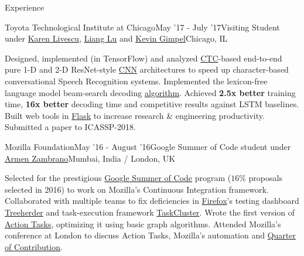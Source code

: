 \documentclass{resume} %
\begin{document}
\begin{rSection}{Experience}
\begin{rSubsection}{Toyota Technological Institute at Chicago}{May '17 - July '17}{Visiting Student under \href{http://ttic.uchicago.edu/~klivescu/}{Karen Livescu}, \href{http://ttic.uchicago.edu/~llu/}{Liang Lu} and \href{http://ttic.uchicago.edu/~kgimpel/}{Kevin Gimpel}}{Chicago, IL}
\item Designed, implemented (in TensorFlow) and analyzed \href{https://en.wikipedia.org/wiki/Connectionist_temporal_classification_(CTC)}{CTC}-based end-to-end pure 1-D and 2-D ResNet-style \href{https://en.wikipedia.org/wiki/Convolutional_neural_network}{CNN} architectures to speed up character-based conversational Speech Recognition systems. Implemented the lexicon-free language model beam-search decoding \href{http://deeplearning.stanford.edu/lexfree/lexfree.pdf}{algorithm}. Achieved \textbf{2.5x better} training time, \textbf{16x better} decoding time and competitive results against LSTM baselines. Built web tools in \href{http://flask.pocoo.org/docs/0.12/}{Flask} to increase research \& engineering productivity. Submitted a paper to ICASSP-2018.
\end{rSubsection}
\vspace*{-3mm}
\begin{rSubsection}{Mozilla Foundation}{May '16 - August '16}{Google Summer of Code student under \href{https://github.com/armenzg}{Armen Zambrano}}{Mumbai, India / London, UK}
\item Selected for the prestigious \href{https://en.wikipedia.org/wiki/Google_Summer_of_Code}{Google Summer of Code} program ($16\%$ proposals selected in 2016) to work on Mozilla's Continuous Integration framework. Collaborated with multiple teams to fix deficiencies in \href{https://en.wikipedia.org/wiki/Firefox}{Firefox}'s testing dashboard \href{https://wiki.mozilla.org/EngineeringProductivity/Projects/Treeherder}{Treeherder} and task-execution framework \href{https://docs.taskcluster.net/}{TaskCluster}. Wrote the first version of \href{https://docs.taskcluster.net/manual/using/actions}{Action Tasks}, optimizing it using basic graph algorithms. Attended Mozilla's conference at London to discuss Action Tasks, Mozilla's automation and \href{https://wiki.mozilla.org/Auto-tools/New_Contributor/Quarter_of_Contribution}{Quarter of Contribution}.
\end{rSubsection}
\end{rSection}
\vspace*{-1.5mm}
\end{document}
